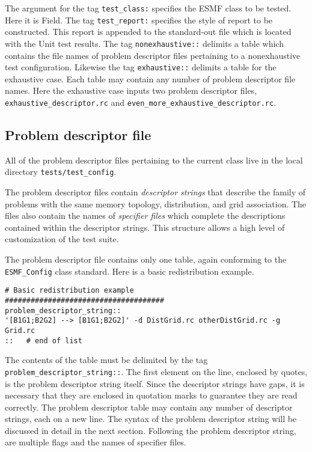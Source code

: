 \documentclass{article}
\begin{document}
The argument for the tag \texttt{test\_class:} specifies the ESMF class to be tested. Here it is Field. The tag  \texttt{test\_report:} specifies the style of report to be constructed. This report is appended to the standard-out file which is located with the Unit test results. The tag \texttt{nonexhaustive::} delimits a table which contains the file names of problem descriptor files pertaining to a nonexhaustive test configuration. Likewise the tag \texttt{exhaustive::} delimits a table for the exhaustive case. Each table may contain any number of problem descriptor file names. Here the exhaustive case inputs two problem descriptor files, \texttt{exhaustive\_descriptor.rc} and \texttt{even\_more\_exhaustive\_descriptor.rc}.

\subsection{Problem descriptor file}
All of the problem descriptor files pertaining to the current class live in the local directory \texttt{tests/test\_config}.

The problem descriptor files contain \textit{descriptor strings} that describe the family of problems with the same memory topology, distribution, and grid association. The files also contain the names of \textit{specifier files} which complete the descriptions contained within the descriptor strings. This structure allows a high level of customization of the test suite.

The problem descriptor file contains only one table, again conforming to the \texttt{ESMF\_Config} class standard. Here is a basic redistribution example.
\begin{verbatim}
# Basic redistribution example
#####################################
problem_descriptor_string::
'[B1G1;B2G2] --> [B1G1;B2G2]' -d DistGrid.rc otherDistGrid.rc -g Grid.rc    
::   # end of list
\end{verbatim}

The contents of the table must be delimited by the tag \texttt{problem\_descriptor\_string::}. The first element on the line, enclosed by quotes, is the problem descriptor string itself. Since the descriptor strings have gaps, it is necessary that they are enclosed in quotation marks to guarantee they are read correctly. The problem descriptor table may contain any number of descriptor strings, each on a new line. The syntax of the problem descriptor string will be discussed in detail in the next section. Following the problem descriptor string, are multiple flags and the names of specifier files. 
\end{document}
